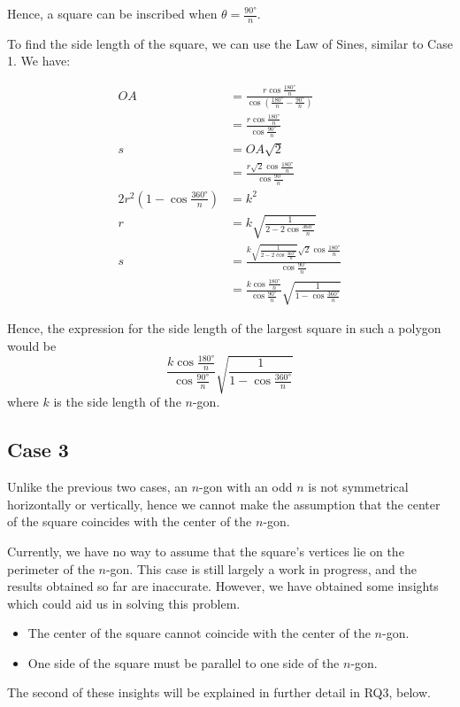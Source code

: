 \documentclass[12pt]{scrartcl}
\begin{document}
Hence, a square can be inscribed when $\theta = \frac{\ang{90}}{n}$.

To find the side length of the square, we can use the Law of Sines, similar to Case 1. We have:

\begin{align*}
	OA & = \frac{r \cos \frac{\ang{180}}{n}}{\cos \left(\frac{\ang{180}}{n} - \frac{\ang{90}}{n}\right)}  \\
	& = \frac{r \cos \frac{\ang{180}}{n}}{\cos \frac{\ang{90}}{n}}  \\
	s & = OA\sqrt{2} \\
	& = \frac{r \sqrt{2} \cos \frac{\ang{180}}{n}}{\cos \frac{\ang{90}}{n}}  \\
	2r^2 \left(1 - \cos \frac{\ang{360}}{n}\right) & = k^2  \\
	r & = k\sqrt{\frac{1}{2 - 2\cos\frac{\ang{360}}{n}}}  \\
	s & =\frac{k\sqrt{\frac{1}{2 - 2\cos\frac{\ang{360}}{n}}} \sqrt{2} \cos \frac{\ang{180}}{n}}{\cos \frac{\ang{90}}{n}}  \\
	& = \frac{k \cos \frac{\ang{180}}{n}}{\cos \frac{\ang{90}}{n}}\sqrt{\frac{1}{1 - \cos\frac{\ang{360}}{n}}}
\end{align*}

Hence, the expression for the side length of the largest square in such a polygon would be
\begin{equation}
\frac{k \cos \frac{\ang{180}}{n}}{\cos \frac{\ang{90}}{n}}\sqrt{\frac{1}{1 - \cos\frac{\ang{360}}{n}}}
\end{equation}
where $k$ is the side length of the $n$-gon.

\pagebreak

\subsection{Case 3}
Unlike the previous two cases, an $n$-gon with an odd $n$ is not symmetrical horizontally or vertically, hence we cannot make the assumption that the center of the square coincides with the center of the $n$-gon.

Currently, we have no way to assume that the square's vertices lie on the perimeter of the $n$-gon.
This case is still largely a work in progress, and the results obtained so far are inaccurate. However, we have obtained some insights which could aid us in solving this problem.

\begin{itemize}
\item The center of the square cannot coincide with the center of the $n$-gon.
\item One side of the square must be parallel to one side of the $n$-gon.
\end{itemize}

The second of these insights will be explained in further detail in RQ3, below.

\printbibliography
\end{document}
